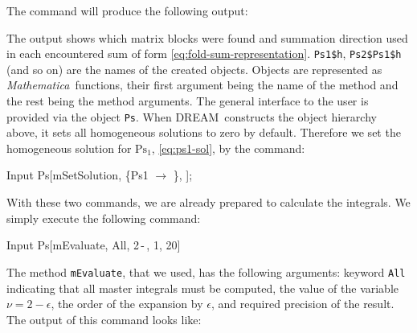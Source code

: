\documentclass[sort&compress]{elsarticle}
\newcommand{\Mathematica}{\textit{Mathematica}}
\begin{document}
The command will produce the following output:
The output shows which matrix blocks were found and summation direction used in each encountered sum of form \eqref{eq:fold-sum-representation}.
\texttt{Ps1\$h}, \texttt{Ps2\$Ps1\$h} (and so on) are the names of the created objects.
Objects are represented as \Mathematica\ functions, their first argument being the name of the method and the rest being the method arguments.
The general interface to the user is provided via the object \texttt{Ps}.
When DREAM\ constructs the object hierarchy above, it sets all homogeneous solutions to zero by default.
Therefore we set the homogeneous solution for $_1$, \cref{eq:ps1-sol}, by the command:
\begin{mmaCell}[moredefined={Ps,Ps1,mSetSolution}]{Input}
	Ps[mSetSolution, \{Ps1 \(\to\) \}, \mmaUnd{\(\nu\)}];
\end{mmaCell}
With these two commands, we are already prepared to calculate the integrals.
We simply execute the following command:
\begin{mmaCell}[moredefined={Ps,mEvaluate}]{Input}
	Ps[mEvaluate, All, 2\,-\,\mmaUnd{\(\epsilon\)}, 1, 20]
\end{mmaCell}
The method \texttt{mEvaluate}, that we used, has the following arguments:
keyword \texttt{All} indicating that all master integrals must be computed,
the value of the variable $-\epsilon$,
the order of the expansion by $\epsilon$,
and required precision of the result.
The output of this command looks like:
\end{document}
